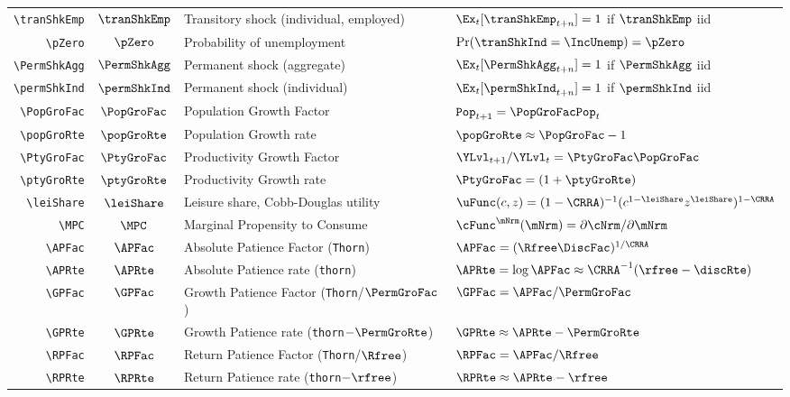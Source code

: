 \documentclass{econark}
\begin{document}
\begin{table}[ht]
\begin{tabular}{|>{\ttfamily}rcll|}
    \\ \verb|\tranShkEmp|  & $\tranShkEmp$ & Transitory shock (individual, employed) &  $\Ex_{t}[\tranShkEmp_{t+n}]=1$ if $\tranShkEmp$ iid
    \\ \verb|\pZero|       & $\pZero$      & Probability of unemployment & $\Pr(\tranShkInd=\IncUnemp)=\pZero$
    \\ \verb|\PermShkAgg|  & $\PermShkAgg$ & Permanent shock (aggregate) & $\Ex_{t}[\PermShkAgg_{t+n}]=1$ if $\PermShkAgg$ iid
    \\ \verb|\permShkInd|  & $\permShkInd$ & Permanent shock (individual) & $\Ex_{t}[\permShkInd_{t+n}]=1$ if $\permShkInd$ iid
    \\ \verb|\PopGroFac|      & $\PopGroFac$ & Population Growth Factor & $\mathtt{Pop}_{t+1} = \PopGroFac \mathtt{Pop}_{t}$
    \\ \verb|\popGroRte|      & $\popGroRte$ & Population Growth rate & $\popGroRte \approx \PopGroFac - 1$
    \\ \verb|\PtyGroFac|      & $\PtyGroFac$ & Productivity Growth Factor & $\YLvl_{t+1}/\YLvl_{t} = \PtyGroFac \PopGroFac$
    \\ \verb|\ptyGroRte|      & $\ptyGroRte$ & Productivity Growth rate & $\PtyGroFac = (1+\ptyGroRte)$
    \\ \verb|\leiShare|    & $\leiShare$ & Leisure share, Cobb-Douglas utility & $\uFunc(c,z)=(1-\CRRA)^{-1}(c^{1-\leiShare}z^{\leiShare})^{1-\CRRA}$
    \\ \verb|\MPC|         & $\MPC$ & Marginal Propensity to Consume & $\cFunc^{\mNrm}(\mNrm)=\partial \cNrm/\partial \mNrm$
    \\ \verb|\APFac|       & $\APFac$ & Absolute Patience Factor (\texttt{Thorn}) & $\APFac = (\Rfree \DiscFac)^{1/\CRRA} $
    \\ \verb|\APRte|       & $\APRte$ & Absolute Patience rate (\texttt{thorn}) & $\APRte = \log \APFac \approx \CRRA^{-1}(\rfree-\discRte) $
    \\ \verb|\GPFac|       & $\GPFac$ & Growth Patience Factor (\texttt{Thorn}/$\PermGroFac$) & $\GPFac = \APFac/\PermGroFac$
    \\ \verb|\GPRte|       & $\GPRte$ & Growth Patience rate (\texttt{thorn}$-\PermGroRte$) & $\GPRte \approx \APRte -\PermGroRte $
    \\ \verb|\RPFac|       & $\RPFac$ & Return Patience Factor (\texttt{Thorn}/$\Rfree$) & $\RPFac = \APFac/\Rfree $
    \\ \verb|\RPRte|        & $\RPRte$ & Return Patience rate (\texttt{thorn}$-\rfree$) & $\RPRte \approx \APRte -\rfree $

\end{tabular}
\end{table}
\end{document}

